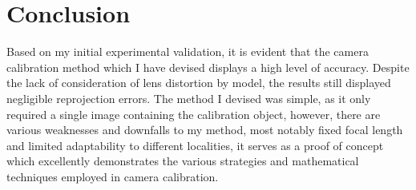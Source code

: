 \section{Conclusion}
Based on my initial experimental validation, it is evident that the camera calibration method which I have devised displays a high level of accuracy. Despite the lack of consideration of lens distortion by model, the results still displayed negligible reprojection errors. The method I devised was simple, as it only required a single image containing the calibration object, however, there are various weaknesses and downfalls to my method, most notably fixed focal length and limited adaptability to different localities, it serves as a proof of concept which excellently demonstrates the various strategies and mathematical techniques employed in camera calibration.
